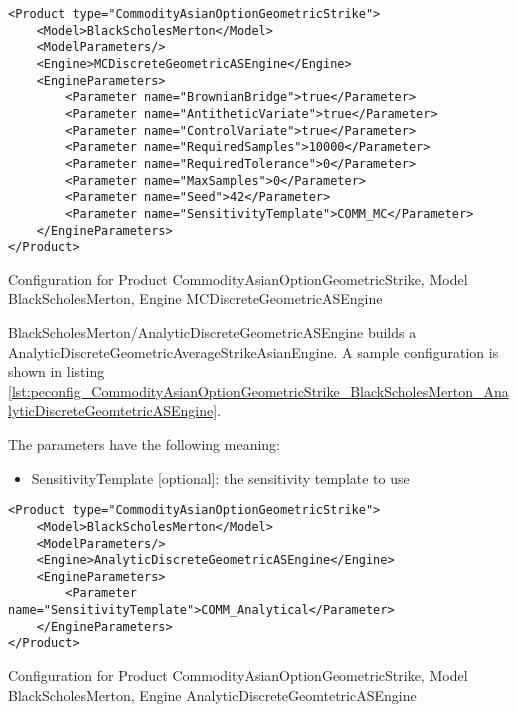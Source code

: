 \begin{longlisting}
\begin{verbatim}
<Product type="CommodityAsianOptionGeometricStrike">
    <Model>BlackScholesMerton</Model>
    <ModelParameters/>
    <Engine>MCDiscreteGeometricASEngine</Engine>
    <EngineParameters>
        <Parameter name="BrownianBridge">true</Parameter>    
        <Parameter name="AntitheticVariate">true</Parameter>    
        <Parameter name="ControlVariate">true</Parameter>    
        <Parameter name="RequiredSamples">10000</Parameter>    
        <Parameter name="RequiredTolerance">0</Parameter>    
        <Parameter name="MaxSamples">0</Parameter>    
        <Parameter name="Seed">42</Parameter>    
        <Parameter name="SensitivityTemplate">COMM_MC</Parameter>
    </EngineParameters>
</Product>
\end{verbatim}
\caption{Configuration for Product CommodityAsianOptionGeometricStrike, Model BlackScholesMerton, Engine MCDiscreteGeometricASEngine}
\label{lst:peconfig_CommodityAsianOptionGeometricStrike_BlackScholesMerton_MCDiscreteGeomtetricASEngine}
\end{longlisting}

BlackScholesMerton/AnalyticDiscreteGeometricASEngine builds a AnalyticDiscreteGeometricAverageStrikeAsianEngine. A sample
configuration is shown in listing
\ref{lst:peconfig_CommodityAsianOptionGeometricStrike_BlackScholesMerton_AnalyticDiscreteGeomtetricASEngine}.

The parameters have the following meaning:

\begin{itemize}
\item SensitivityTemplate [optional]: the sensitivity template to use 
\end{itemize}

\begin{longlisting}
\begin{verbatim}
<Product type="CommodityAsianOptionGeometricStrike">
    <Model>BlackScholesMerton</Model>
    <ModelParameters/>
    <Engine>AnalyticDiscreteGeometricASEngine</Engine>
    <EngineParameters>
        <Parameter name="SensitivityTemplate">COMM_Analytical</Parameter>
    </EngineParameters>
</Product>
\end{verbatim}
\caption{Configuration for Product CommodityAsianOptionGeometricStrike, Model BlackScholesMerton, Engine AnalyticDiscreteGeomtetricASEngine}
\label{lst:peconfig_CommodityAsianOptionGeometricStrike_BlackScholesMerton_AnalyticDiscreteGeomtetricASEngine}
\end{longlisting}

